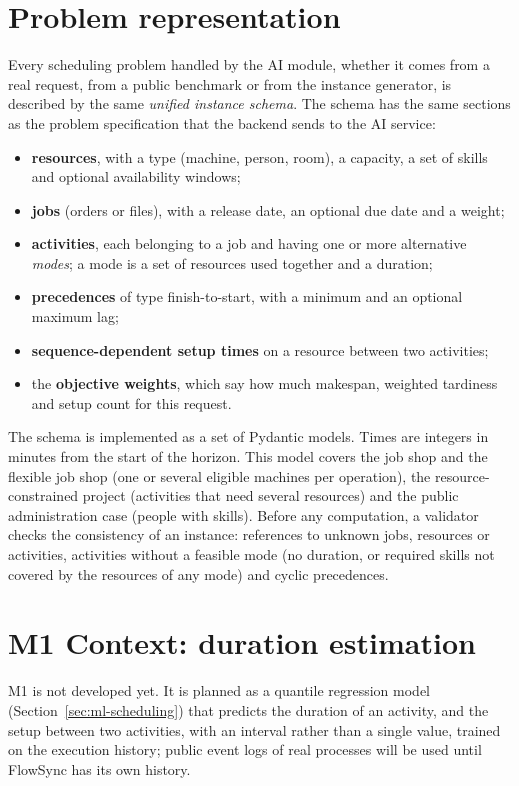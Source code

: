 \section{Problem representation}
\label{sec:instance-schema}

Every scheduling problem handled by the AI module, whether it comes from a real request, from a
public benchmark or from the instance generator, is described by the same \emph{unified
instance schema}. The schema has the same sections as the problem specification that the backend
sends to the AI service:
\begin{itemize}
  \item \textbf{resources}, with a type (machine, person, room), a capacity, a set of skills and
        optional availability windows;
  \item \textbf{jobs} (orders or files), with a release date, an optional due date and a weight;
  \item \textbf{activities}, each belonging to a job and having one or more alternative
        \emph{modes}; a mode is a set of resources used together and a duration;
  \item \textbf{precedences} of type finish-to-start, with a minimum and an optional maximum lag;
  \item \textbf{sequence-dependent setup times} on a resource between two activities;
  \item the \textbf{objective weights}, which say how much makespan, weighted tardiness and
        setup count for this request.
\end{itemize}
The schema is implemented as a set of Pydantic models. Times are integers in minutes from the
start of the horizon. This model covers the job shop and
the flexible job shop (one or several eligible machines per operation), the resource-constrained
project (activities that need several resources) and the public administration case (people
with skills). Before any computation, a validator checks the consistency of an instance:
references to unknown jobs, resources or activities, activities without a feasible mode (no
duration, or required skills not covered by the resources of any mode) and cyclic precedences.

\section{M1 Context: duration estimation}
\label{sec:m1}

M1 is not developed yet. It is planned as a quantile regression model
(Section~\ref{sec:ml-scheduling}) that predicts the duration of an activity, and the setup between
two activities, with an interval rather than a single value, trained on the execution history;
public event logs of real processes will be used until FlowSync has its own history.

